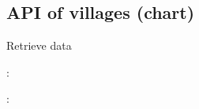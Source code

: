 \documentclass[letterpaper,10pt,english,openany,oneside]{sphinxmanual}
\begin{document}
\subsection{API of villages (chart)}
\label{\detokenize{api/v4:api-of-villages-chart}}

\begin{fulllineitems}
\label{\detokenize{api/v4:post--api4-Reports-vill_surveillance}}
\sphinxAtStartPar
Retrieve data

\sphinxAtStartPar
{}:

\begin{sphinxVerbatim}[commandchars=\\\{\}]
   
   
   
   
\end{sphinxVerbatim}

\sphinxAtStartPar
{}:


\end{fulllineitems}
\end{document}

